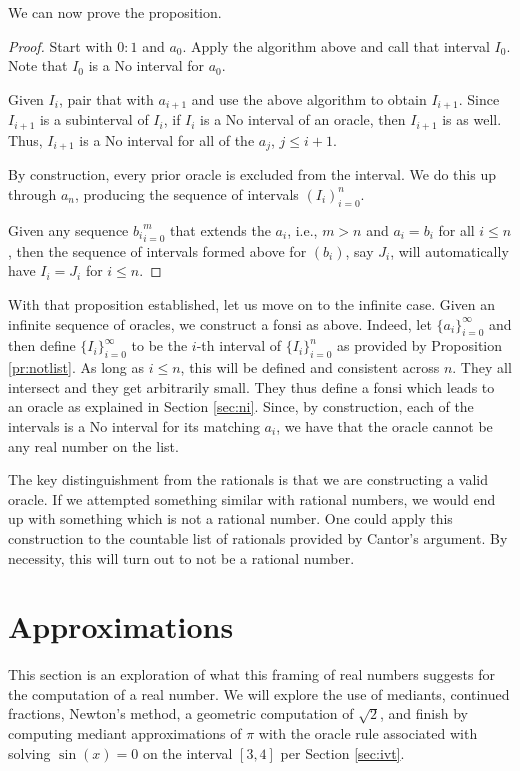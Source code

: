 \documentclass[12pt]{article}
\begin{document}
We can now prove the proposition.

\begin{proof}
Start with $0:1$ and $a_0$. Apply the algorithm above and call that interval $I_0$. Note that $I_0$ is a No interval for $a_0$. 

Given $I_i$, pair that with $a_{i+1}$ and use the above algorithm to obtain $I_{i+1}$. Since $I_{i+1}$ is a subinterval of $I_i$, if $I_i$ is a No interval of an oracle, then $I_{i+1}$ is as well. Thus, $I_{i+1}$ is a No interval for all of the $a_j$, $j \leq i+1$.

By construction, every prior oracle is excluded from the interval. We do this up through $a_n$, producing the sequence of intervals $(I_i)_{i=0}^n$. 

Given any sequence ${b_i}_{i=0}^m$ that extends the $a_i$, i.e., $m>n$ and $a_i = b_i$ for all $i \leq n$, then the sequence of intervals formed above for $(b_i)$, say $J_i$, will automatically have $I_i = J_i$ for $i \leq n$. 

\end{proof} 

With that proposition established, let us move on to the infinite case. Given an infinite sequence of oracles, we construct a fonsi as above. Indeed, let $\{a_i\}_{i=0}^{\infty}$ and then define $\{I_i\}_{i=0}^{\infty}$ to be the $i$-th interval of $\{I_i\}_{i=0}^{n}$ as provided by Proposition \ref{pr:notlist}. As long as $i \leq n$, this will be defined and consistent across $n$. They all intersect and they get arbitrarily small. They thus define a fonsi which leads to an oracle as explained in Section \ref{sec:ni}. Since, by construction, each of the intervals is a No interval for its matching $a_i$, we have that the oracle cannot be any real number on the list. 

The key distinguishment from the rationals is that we are constructing a valid oracle. If we attempted something similar with rational numbers, we would end up with something which is not a rational number. One could apply this construction to the countable list of rationals provided by Cantor's argument. By necessity, this will turn out to not be a rational number. 

\section{Approximations}\label{sec:mediant}

This section is an exploration of what this framing of real numbers suggests for the computation of a real number. We will explore the use of mediants, continued fractions, Newton's method, a geometric computation of $\sqrt{2}$, and finish by computing mediant approximations of $\pi$ with the oracle  rule associated with solving $\sin(x)=0$ on the interval $[3,4]$ per Section \ref{sec:ivt}.
\end{document}
